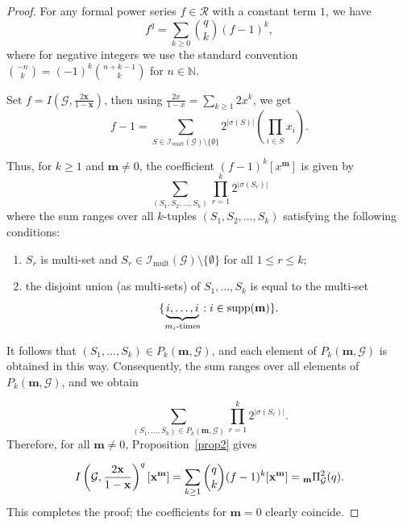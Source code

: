 \documentclass[11pt,reqno]{amsart}
\numberwithin{equation}{section} %
\theoremstyle{definition}
\theoremstyle{remark}
\numberwithin{equation}{section}
\begin{document}
\begin{proof}
For any formal power series $f \in \mathcal R$ with a constant term $1$, we have
\[
f^q = \sum_{k \ge 0} \binom{q}{k}(f-1)^k,
\]
where for negative integers we use the standard convention $\binom{-n}{k} = (-1)^k \binom{n+k-1}{k}$ for $n \in \mathbb{N}$.

Set $f=I(\mathcal{G}, \frac{2\mathbf x}{1-\mathbf x})$, then using $\frac{2 x}{1- x}=\sum\limits_{k\ge 1}2x^k$, we get 
 $$ f-1 =\sum_{S\in \mathcal{I}_{mult}(\mathcal{G})\setminus\{\emptyset \}}2^{|\sigma(S)|}\left(\prod_{i\in S}x_i\right).$$

Thus, for $k\geq 1$ and $\mathbf{m}\neq 0$, the coefficient $(f-1)^k[x^\mathbf{m}]$ is given by 
        $$\sum_{(S_1,S_2, \ldots, S_k)}\prod_{r=1}^k 2^{|\sigma(S_r)|}$$
        where the sum ranges over all $k$-tuples  $(S_1, S_2, \ldots, S_k)$ satisfying the following conditions:
    \begin{enumerate}
        \item $S_r$ is multi-set and $S_r \in \mathcal{I}_{\mathrm{mult}}(\mathcal{G})\setminus \{\emptyset\}$ for all $1 \leq r \leq k;$
        \item the disjoint union (as multi-sets) of $S_1, \ldots, S_k$ is equal to the multi-set $$\{\underbrace{i, \ldots,i}_{m_i\text{-times}} : i\in\mathrm{supp}(\bold{m})\}.$$
    \end{enumerate}
    It follows that $(S_1, \dots, S_k) \in P_k(\mathbf{m}, \mathcal{G})$, and each element of $P_k(\mathbf{m}, \mathcal{G})$  is obtained in this way. Consequently, the sum ranges over all elements of $P_k(\mathbf{m}, \mathcal{G})$, and we obtain

     $$\sum_{(S_1,\dots,S_k)\in P_k(\mathbf{m},\mathcal{G})}\prod_{r=1}^k 2^{|\sigma(S_r)|}.$$ 
    Therefore, for all $\mathbf{m} \neq 0$, Proposition~\ref{prop2} gives

        $$I\left(\mathcal{G}, \frac{2\mathbf x}{1-\mathbf x}\right)^q [\mathbf{x}^\mathbf{m}]=\sum_{k\geq 1}\binom{q}{k}(f-1)^k[\mathbf{x}^\mathbf{m}] ={_{\bold{m}}\Pi^{2}_\mathcal{G}(q)}.$$
This completes the proof; the coefficients for $\mathbf{m}=0$ clearly coincide.
\end{proof}
\end{document}
